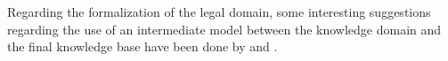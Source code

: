 Regarding the formalization of the legal domain, some interesting suggestions regarding the use of an intermediate model between the knowledge domain and the final knowledge base have been done by \cite{Bench-Capon1992} and \cite{ijmms/KralingenVBH99}.
\begin{comment}
The purpose of this intermediate model is to ensure a thorough analysis of the domain, independent of the implementation goal.
Although we share this concern, we see an additional role for the intermediate model, i.e., to facilitate communication between the domain expert and the modeller.
Therefore we prefer to use the DMN-based tool OpenRules.




The use of the DMN-based tool of OpenRules, allows to define concepts and attributes in a business glossary, while rules are formalized in decision tables.
These parts are analog to the \textit{class hierarchy} and \textit{rule base} parts suggested by \cite{Bench-Capon1992}.
Especially in \cite{Bench-Capon1992}, the importance of an analog structure of the knowledge base and legislation, what they refer to as \textit{isomorphism}, is stressed.
While our program shows some isomorph characteristics %
, we sometimes deviate from the principle.
For example, subsection 2 contains a number of articles that each describe a separate registration type with its applicable tax rate. 
In the knowledge base of our application, the registration type is defined in one definition (with each rule referring to a separate article).
The tax rate however, is defined in a separate definition (referring to the same articles).
The dogmatic use of isomorphism seems less relevant in the limited scope of our application and with the implemented features of explanation and relevance.
\end{comment}
